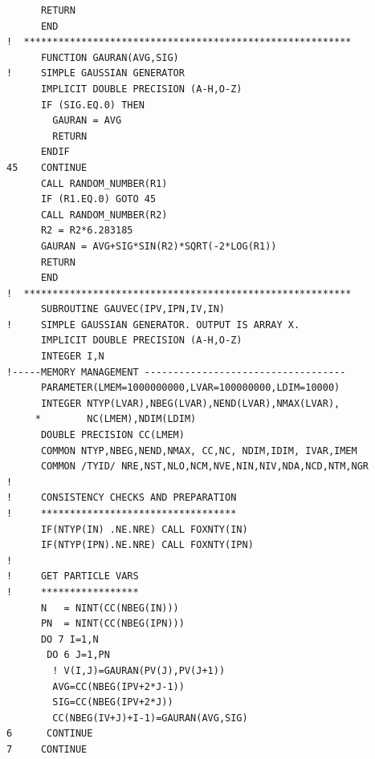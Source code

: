\begin{lstlisting}
      RETURN 
      END
!  *********************************************************
      FUNCTION GAURAN(AVG,SIG)
!     SIMPLE GAUSSIAN GENERATOR
      IMPLICIT DOUBLE PRECISION (A-H,O-Z)
      IF (SIG.EQ.0) THEN
        GAURAN = AVG
        RETURN
      ENDIF
45    CONTINUE
      CALL RANDOM_NUMBER(R1)
      IF (R1.EQ.0) GOTO 45
      CALL RANDOM_NUMBER(R2)
      R2 = R2*6.283185
      GAURAN = AVG+SIG*SIN(R2)*SQRT(-2*LOG(R1))
      RETURN
      END
!  *********************************************************
      SUBROUTINE GAUVEC(IPV,IPN,IV,IN)
!     SIMPLE GAUSSIAN GENERATOR. OUTPUT IS ARRAY X.
      IMPLICIT DOUBLE PRECISION (A-H,O-Z)
      INTEGER I,N
!-----MEMORY MANAGEMENT -----------------------------------
      PARAMETER(LMEM=1000000000,LVAR=100000000,LDIM=10000)
      INTEGER NTYP(LVAR),NBEG(LVAR),NEND(LVAR),NMAX(LVAR),
     *        NC(LMEM),NDIM(LDIM)
      DOUBLE PRECISION CC(LMEM)
      COMMON NTYP,NBEG,NEND,NMAX, CC,NC, NDIM,IDIM, IVAR,IMEM
      COMMON /TYID/ NRE,NST,NLO,NCM,NVE,NIN,NIV,NDA,NCD,NTM,NGR
!
!     CONSISTENCY CHECKS AND PREPARATION
!     **********************************
      IF(NTYP(IN) .NE.NRE) CALL FOXNTY(IN)
      IF(NTYP(IPN).NE.NRE) CALL FOXNTY(IPN)
!
!     GET PARTICLE VARS
!     *****************
      N   = NINT(CC(NBEG(IN)))
      PN  = NINT(CC(NBEG(IPN)))
      DO 7 I=1,N
       DO 6 J=1,PN
        ! V(I,J)=GAURAN(PV(J),PV(J+1))
        AVG=CC(NBEG(IPV+2*J-1))
        SIG=CC(NBEG(IPV+2*J))
        CC(NBEG(IV+J)+I-1)=GAURAN(AVG,SIG)
6      CONTINUE
7     CONTINUE


\end{lstlisting}
